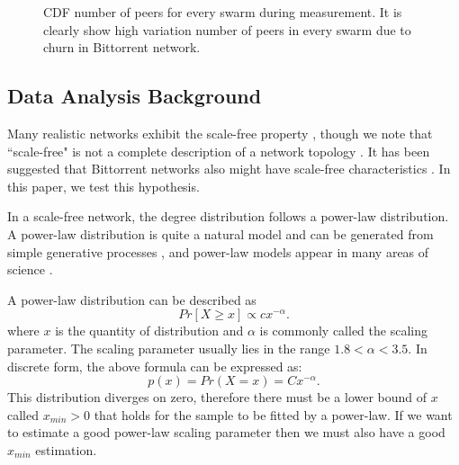 \documentclass[10pt,conference,letterpaper]{IEEEtran}
\begin{document}
\begin{figure}
\centering
{}
\caption{CDF number of peers for every swarm during measurement. It is clearly show high variation number of peers in every swarm due to churn in Bittorrent network.} 
\label{fig:num_peers}
\vspace{-2mm}
\end{figure}

\subsection{Data Analysis Background}
Many realistic networks exhibit the scale-free property \cite{clauset2009power}, though we note that ``scale-free" is not a complete description of a network topology \cite{doyle2005robust}\cite{mahadevan2006systematic}. 
It has been suggested that Bittorrent networks also might have scale-free characteristics \cite{dale2008evolution}. 
In this paper, we test this hypothesis. 

In a scale-free network, the degree distribution follows a power-law distribution.   
A power-law distribution is quite a natural model and can be generated from simple generative processes \cite{mitzenmacher2004brief}, and power-law models appear in many areas of science \cite{clauset2009power} \cite{mitzenmacher2004brief}. 

A power-law distribution can be described as
\begin{equation}
Pr[X\ge x] \propto cx^{-\alpha}.
\label{eq:powerlaw}
\end{equation}
where $x$ is the quantity of distribution and $\alpha$ is commonly called the scaling parameter. 
The scaling parameter usually lies in the range $1.8<\alpha<3.5$.
In discrete form, the above formula can be expressed as:
\begin{equation}
p(x) = Pr(X=x) = Cx^{- \alpha}.
\label{eq:powerlawdiscrete}
\end{equation}
This distribution diverges on zero, therefore there must be a lower bound of $x$ called $x_{min} > 0$ that holds for the sample to be fitted by a power-law. 
If we want to estimate a good power-law scaling parameter then we must also have a good $x_{min}$ estimation. 
\end{document}

